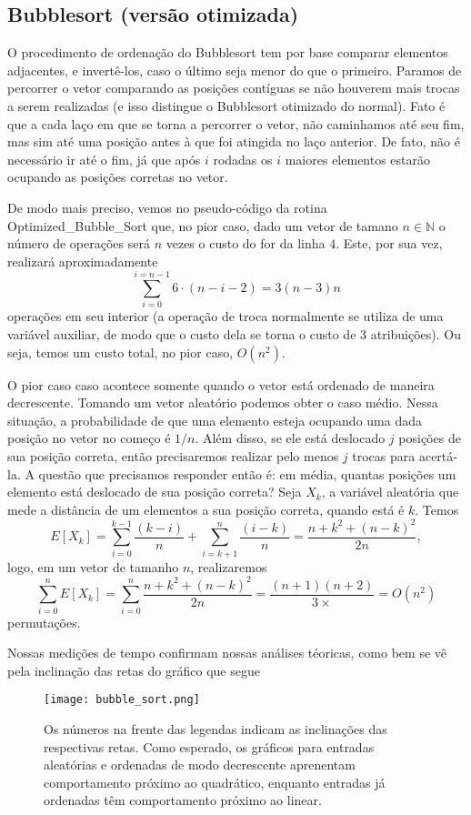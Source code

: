 \documentclass{article}
\begin{document}
\subsection{Bubblesort (versão otimizada)}
O procedimento de ordenação do Bubblesort tem por base comparar elementos adjacentes, e invertê-los, caso o último seja menor do que o primeiro. Paramos de percorrer o vetor comparando as posições contíguas se não houverem mais trocas a serem realizadas (e isso distingue o Bubblesort otimizado do normal). Fato é que a cada laço em que se torna a percorrer o vetor, não caminhamos até seu fim, mas sim até uma posição antes à que foi atingida no laço anterior. De fato, não é necessário ir até o fim, já que após $i$ rodadas os $i$ maiores elementos estarão ocupando as posições corretas no vetor.\par
%
De modo mais preciso, vemos no pseudo-código da rotina Optimized\_Bubble\_Sort que, no pior caso, dado um vetor de tamano $n \in \mathbb{N}$ o número de operações será $n$ vezes o custo do for da linha $4$. Este, por sua vez, realizará aproximadamente 
\[\sum_{i = 0}^{i = n-1}6\cdot(n-i-2) = 3(n - 3)n\] operações em seu interior (a operação de troca normalmente se utiliza de uma variável auxiliar, de modo que o custo dela se torna o custo de 3 atribuições). Ou seja, temos um custo total, no pior caso, $O(n^2)$.\par
O pior caso caso acontece somente quando o vetor está ordenado de maneira decrescente. Tomando um vetor aleatório podemos obter o caso médio. Nessa situação, a probabilidade de que uma elemento esteja ocupando uma dada posição no vetor no começo é $1/n$. Além disso, se ele está deslocado $j$ posições de sua posição correta, então precisaremos realizar pelo menos $j$ trocas para acertá-la. A questão que precisamos responder então é: em média, quantas posições um elemento está deslocado de sua posição correta? Seja $X_k$, a variável aleatória que mede a distância de um elementos a sua posição correta, quando está é $k$. Temos \[E[X_k] = \sum_{i = 0}^{k-1}\frac{(k-i)}{n}+\sum_{i = k+1}^{n}\frac{(i - k)}{n} = \frac{n+k^{2}+(n-k)^{2}}{2n},\] logo, em um vetor de tamanho $n$, realizaremos \[\sum_{i=0}^{n}E[X_k] = \sum_{i=0}^{n}\frac{n+k^{2}+(n-k)^{2}}{2n} = \frac{(n+1)(n+2)}{3×} = O(n^2)\] permutações.\par
%
Nossas medições de tempo confirmam nossas análises téoricas, como bem se vê pela inclinação das retas do gráfico que segue
\begin{figure}[h]
    \centering
    \texttt{[image: bubble\_sort.png]}
    \caption{Os números na frente das legendas indicam as inclinações das respectivas retas. Como esperado, os gráficos para entradas aleatórias e ordenadas de modo decrescente aprenentam comportamento próximo ao quadrático, enquanto entradas já ordenadas têm comportamento próximo ao linear.}
\end{figure}
\end{document}
